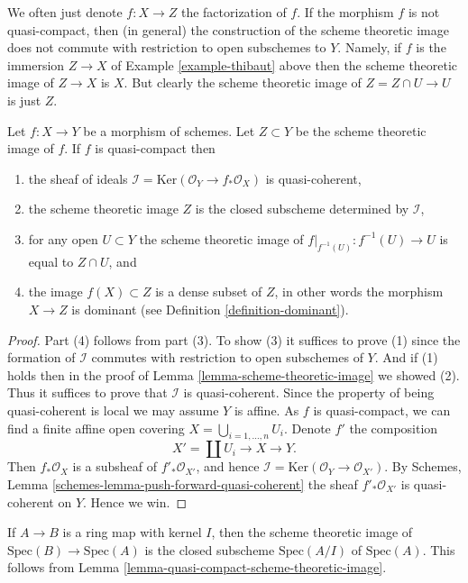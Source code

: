 \noindent
We often just denote $f : X \to Z$ the factorization of $f$.
If the morphism $f$ is not quasi-compact, then (in general) the
construction of the scheme theoretic image does not commute with
restriction to open subschemes to $Y$. Namely, if $f$ is the
immersion $Z \to X$ of Example \ref{example-thibaut} above then
the scheme theoretic image of $Z \to X$ is $X$. But clearly the
scheme theoretic image of $Z = Z \cap U \to U$ is just $Z$.

\begin{lemma}
\label{lemma-quasi-compact-scheme-theoretic-image}
Let $f : X \to Y$ be a morphism of schemes.
Let $Z \subset Y$ be the scheme theoretic image of $f$.
If $f$ is quasi-compact then
\begin{enumerate}
\item the sheaf of ideals
$\mathcal{I} = \text{Ker}(\mathcal{O}_Y \to f_*\mathcal{O}_X)$
is quasi-coherent,
\item the scheme theoretic image $Z$ is the closed subscheme
determined by $\mathcal{I}$,
\item for any open $U \subset Y$ the scheme theoretic image of
$f|_{f^{-1}(U)} : f^{-1}(U) \to U$ is equal to $Z \cap U$, and
\item the image $f(X) \subset Z$ is a dense subset of $Z$, in other
words the morphism $X \to Z$ is dominant
(see Definition \ref{definition-dominant}).
\end{enumerate}
\end{lemma}

\begin{proof}
Part (4) follows from part (3). To show (3) it suffices
to prove (1) since the formation of $\mathcal{I}$ commutes with restriction to
open subschemes of $Y$. And if (1) holds then in the proof of 
Lemma \ref{lemma-scheme-theoretic-image}
we showed (2). Thus it suffices to prove that $\mathcal{I}$ is quasi-coherent.
Since the property of being quasi-coherent is
local we may assume $Y$ is affine. As $f$ is quasi-compact,
we can find a finite affine open covering
$X = \bigcup_{i = 1, \ldots, n} U_i$. Denote $f'$ the composition
$$
X' = \coprod U_i \longrightarrow X \longrightarrow Y.
$$
Then $f_*\mathcal{O}_X$ is a subsheaf of $f'_*\mathcal{O}_{X'}$,
and hence $\mathcal{I} = \text{Ker}(\mathcal{O}_Y \to \mathcal{O}_{X'})$.
By Schemes, Lemma \ref{schemes-lemma-push-forward-quasi-coherent}
the sheaf $f'_*\mathcal{O}_{X'}$ is quasi-coherent on $Y$. Hence we win.
\end{proof}

\begin{example}
\label{example-scheme-theoretic-image}
If $A \to B$ is a ring map with kernel $I$, then the scheme theoretic image
of $\text{Spec}(B) \to \text{Spec}(A)$ is the closed subscheme
$\text{Spec}(A/I)$ of $\text{Spec}(A)$. This follows from
Lemma \ref{lemma-quasi-compact-scheme-theoretic-image}.
\end{example}

